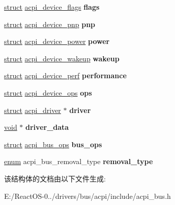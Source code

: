 \begin{DoxyCompactItemize}
\hyperlink{interfacestruct}{struct} \hyperlink{structacpi__device__flags}{acpi\+\_\+device\+\_\+flags} {\bfseries flags}
\item 
\mbox{\label{structacpi__device_ac5bb26eb94693d0751f2808d8cdbcedb}} 
\hyperlink{interfacestruct}{struct} \hyperlink{structacpi__device__pnp}{acpi\+\_\+device\+\_\+pnp} {\bfseries pnp}
\item 
\mbox{\label{structacpi__device_a218dc6b501369b5cca4df97a1b212f97}} 
\hyperlink{interfacestruct}{struct} \hyperlink{structacpi__device__power}{acpi\+\_\+device\+\_\+power} {\bfseries power}
\item 
\mbox{\label{structacpi__device_a9069e717c0cbfe680e976d0d1f5b01e8}} 
\hyperlink{interfacestruct}{struct} \hyperlink{structacpi__device__wakeup}{acpi\+\_\+device\+\_\+wakeup} {\bfseries wakeup}
\item 
\mbox{\label{structacpi__device_a71cadc8f8886deda68623ec9b3ac5c46}} 
\hyperlink{interfacestruct}{struct} \hyperlink{structacpi__device__perf}{acpi\+\_\+device\+\_\+perf} {\bfseries performance}
\item 
\mbox{\label{structacpi__device_a3c7f7e94116c0f378d205d8c6455b61d}} 
\hyperlink{interfacestruct}{struct} \hyperlink{structacpi__device__ops}{acpi\+\_\+device\+\_\+ops} {\bfseries ops}
\item 
\mbox{\label{structacpi__device_a94334b7392b94944771175b51ce46980}} 
\hyperlink{interfacestruct}{struct} \hyperlink{structacpi__driver}{acpi\+\_\+driver} $\ast$ {\bfseries driver}
\item 
\mbox{\label{structacpi__device_a31aaa0519afcd7dd26830dcf569eafa3}} 
\hyperlink{interfacevoid}{void} $\ast$ {\bfseries driver\+\_\+data}
\item 
\mbox{\label{structacpi__device_a81ecd094fc3efc4bd6084fa293a48c3e}} 
\hyperlink{interfacestruct}{struct} \hyperlink{structacpi__bus__ops}{acpi\+\_\+bus\+\_\+ops} {\bfseries bus\+\_\+ops}
\item 
\mbox{\label{structacpi__device_ad05b8b0998f31525c35624989f11121e}} 
\hyperlink{interfaceenum}{enum} acpi\+\_\+bus\+\_\+removal\+\_\+type {\bfseries removal\+\_\+type}
\end{DoxyCompactItemize}


该结构体的文档由以下文件生成\+:\begin{DoxyCompactItemize}
\item 
E\+:/\+React\+O\+S-\/0../drivers/bus/acpi/include/acpi\+\_\+bus.\+h\end{DoxyCompactItemize}
